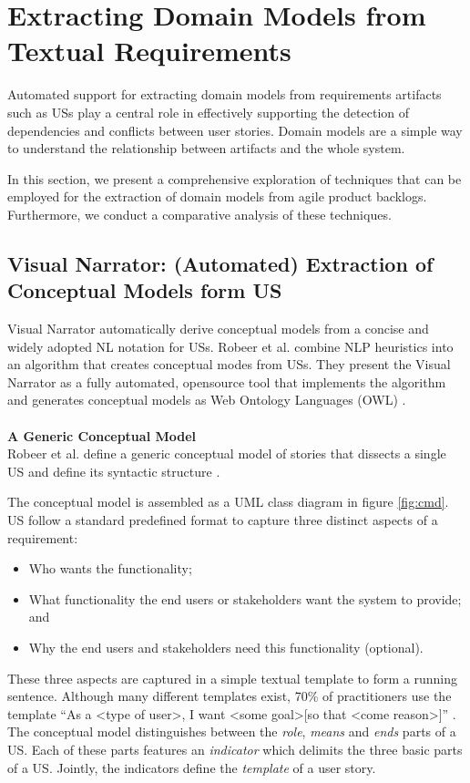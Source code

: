\section{Extracting Domain Models from Textual Requirements}\label{dmodel}
Automated support for extracting domain models from requirements artifacts such as USs play a central role in effectively supporting the detection of dependencies and conflicts between user stories. Domain models are a simple way to understand the relationship between artifacts and the whole system. 

In this section, we present a comprehensive exploration of techniques that can be employed for the extraction of domain models from agile product backlogs. Furthermore, we conduct a comparative analysis of these techniques. 
\subsection{Visual Narrator: (Automated) Extraction of Conceptual Models form US} \label{vnarrator}
Visual Narrator automatically derive conceptual models from a concise and widely adopted NL notation for USs. Robeer et al. combine NLP heuristics into an algorithm that creates conceptual modes from USs. They present the Visual Narrator as a fully automated, opensource tool that implements the algorithm and generates conceptual models as Web Ontology Languages (OWL) \cite{Robeer2016}.\\ \\ 
\textbf{A Generic Conceptual Model}\\
Robeer et al. define a generic conceptual model of stories that dissects a single US and define its syntactic structure \cite{Lucassen2015}. 

The conceptual model is assembled as a UML class diagram in figure \ref{fig:cmd}. US follow a standard predeﬁned format \cite{Wautelet2014} to capture three distinct aspects of a requirement:
\begin{itemize}
\item Who wants the functionality;
\item What functionality the end users or stakeholders want the system to provide; and 
\item Why the end users and stakeholders need this functionality (optional).
\end{itemize}
These three aspects are captured in a simple textual template to form a running sentence. Although many different templates exist, 70\% of practitioners use the template \enquote{As a \textless type of user\textgreater, I want \textless some goal\textgreater [so that \textless come reason\textgreater ]} \cite{Greer2004}. 
The conceptual model distinguishes between the \emph{role}, \emph{means} and \emph{ends} parts of a US. Each of these parts features an \emph{indicator} which delimits the three basic parts of a US. Jointly, the indicators deﬁne the \emph{template} of a user story.

